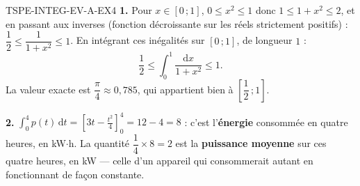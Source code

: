 \begin{corrige}{TSPE-INTEG-EV-A-EX4}
\textbf{1.} Pour $x\in[0\,;1]$, $0\leq x^2\leq1$ donc $1\leq1+x^2\leq2$, et en passant aux inverses (fonction décroissante sur les réels strictement positifs) :
$\dfrac12\leq\dfrac{1}{1+x^2}\leq1$. En intégrant ces inégalités sur $[0\,;1]$, de longueur $1$ :
\[
  \frac12 \leq \int_0^1\frac{\mathrm{d}x}{1+x^2} \leq 1 .
\]
La valeur exacte est $\dfrac{\pi}{4}\approx0{,}785$, qui appartient bien à $\left[\dfrac12\,;1\right]$.

\textbf{2.} $\displaystyle\int_0^4 p(t)\,\mathrm{d}t=\left[3t-\frac{t^2}{4}\right]_0^4=12-4=8$ : c'est l'\textbf{énergie} consommée en quatre heures, en kW$\cdot$h. La quantité $\dfrac14\times8=2$ est la \textbf{puissance moyenne} sur ces quatre heures, en kW — celle d'un appareil qui consommerait autant en fonctionnant de façon constante.
\end{corrige}
